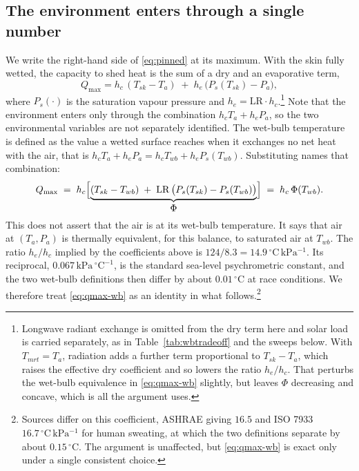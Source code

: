 \subsection{The environment enters through a single number}
\label{app:physics:head}

We write the right-hand side of \eqref{eq:pinned} at its maximum. With the skin
fully wetted, the capacity to shed heat is the sum of a dry and an evaporative
term,
\begin{equation}
  Q_{\max} = h_c\,(T_{sk} - T_a) \;+\; h_e\,\bigl(P_{s}(T_{sk}) - P_a\bigr),
  \label{eq:qmax-raw}
\end{equation}
where $P_s(\cdot)$ is the saturation vapour pressure and $h_e = \mathrm{LR}\cdot
h_c$.\footnote{Longwave radiant exchange is omitted from the dry term here and
solar load is carried separately, as in Table~\ref{tab:wbtradeoff} and the
sweeps below. With $T_{mrt} = T_a$, radiation adds a further term proportional
to $T_{sk} - T_a$, which raises the effective dry coefficient and so lowers the
ratio $h_e/h_c$. That perturbs the wet-bulb equivalence in \eqref{eq:qmax-wb}
slightly, but leaves $\Phi$ decreasing and concave, which is all the argument
uses.}
Note that the environment enters only through the combination $h_c T_a + h_e
P_a$, so the two environmental variables are not separately identified. The
wet-bulb temperature is defined as the value a wetted surface reaches when it
exchanges no net heat with the air, that is $h_c T_a + h_e P_a = h_c T_{wb} +
h_e P_s(T_{wb})$. Substituting names that combination:
\begin{equation}
  Q_{\max} \;=\; h_c\Bigl[\underbrace{(T_{sk} - T_{wb}) \;+\; \mathrm{LR}\,
    \bigl(P_s(T_{sk}) - P_s(T_{wb})\bigr)}_{\textstyle \Phi}\Bigr]
  \;=\; h_c\,\Phi(T_{wb}).
  \label{eq:qmax-wb}
\end{equation}
This does not assert that the air is at its wet-bulb temperature. It says that
air at $(T_a, P_a)$ is thermally equivalent, for this balance, to saturated air
at $T_{wb}$. The ratio $h_e/h_c$ implied by the coefficients above is $124/8.3 =
14.9\,^{\circ}\mathrm{C\,kPa^{-1}}$. Its reciprocal,
$0.067\,\mathrm{kPa}\,^{\circ}\mathrm{C}^{-1}$, is the standard sea-level
psychrometric constant, and the two wet-bulb definitions then differ by about
$0.01\,^{\circ}$C at race conditions. We therefore treat \eqref{eq:qmax-wb} as
an identity in what follows.\footnote{Sources differ on this coefficient, ASHRAE giving
$16.5$ and ISO 7933 $16.7\,^{\circ}\mathrm{C\,kPa^{-1}}$ for human sweating, at
which the two definitions separate by about $0.15\,^{\circ}$C. The argument is
unaffected, but \eqref{eq:qmax-wb} is exact only under a single consistent
choice.}

